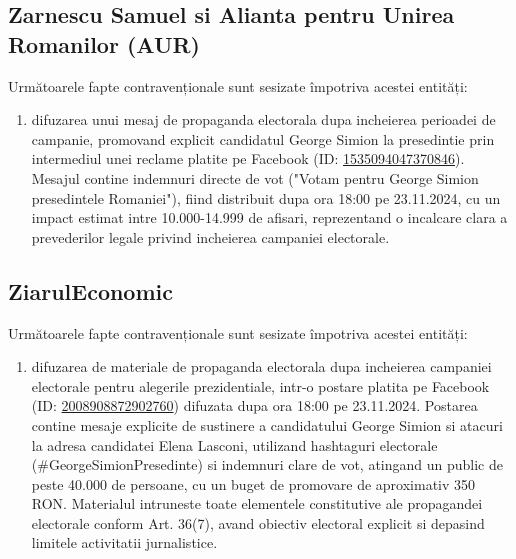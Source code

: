 \documentclass[a4paper,12pt]{article}
\begin{document}
\vspace{0.5cm}

\subsection{Zarnescu Samuel si Alianta pentru Unirea Romanilor (AUR)}
Următoarele fapte contravenționale sunt sesizate împotriva acestei entități:

\begin{enumerate}[leftmargin=*, label=\arabic*.)]
    \item difuzarea unui mesaj de propaganda electorala dupa incheierea perioadei de campanie, promovand explicit candidatul George Simion la presedintie prin intermediul unei reclame platite pe Facebook (ID: \href{https://www.facebook.com/ads/library/?id=1535094047370846}{1535094047370846}). Mesajul contine indemnuri directe de vot ("Votam pentru George Simion presedintele Romaniei"), fiind distribuit dupa ora 18:00 pe 23.11.2024, cu un impact estimat intre 10.000-14.999 de afisari, reprezentand o incalcare clara a prevederilor legale privind incheierea campaniei electorale.
\end{enumerate}

\vspace{0.5cm}

\subsection{ZiarulEconomic}
Următoarele fapte contravenționale sunt sesizate împotriva acestei entități:

\begin{enumerate}[leftmargin=*, label=\arabic*.)]
    \item difuzarea de materiale de propaganda electorala dupa incheierea campaniei electorale pentru alegerile prezidentiale, intr-o postare platita pe Facebook (ID: \href{https://www.facebook.com/ads/library/?id=2008908872902760}{2008908872902760}) difuzata dupa ora 18:00 pe 23.11.2024. Postarea contine mesaje explicite de sustinere a candidatului George Simion si atacuri la adresa candidatei Elena Lasconi, utilizand hashtaguri electorale (\#GeorgeSimionPresedinte) si indemnuri clare de vot, atingand un public de peste 40.000 de persoane, cu un buget de promovare de aproximativ 350 RON. Materialul intruneste toate elementele constitutive ale propagandei electorale conform Art. 36(7), avand obiectiv electoral explicit si depasind limitele activitatii jurnalistice.
\end{enumerate}
\end{document}
